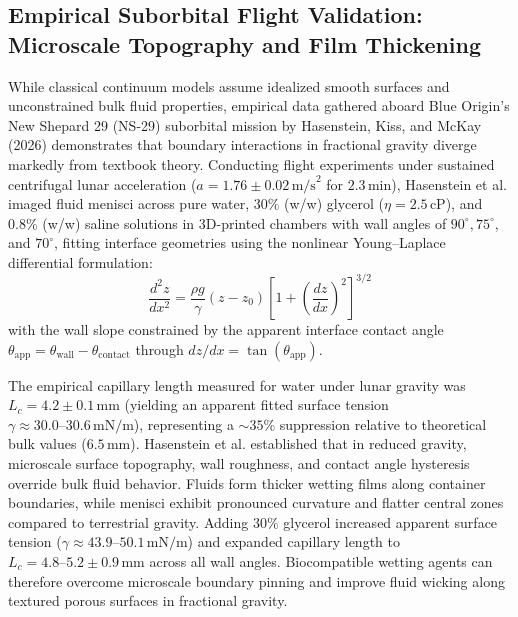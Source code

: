 \subsection{Empirical Suborbital Flight Validation: Microscale Topography and Film Thickening}
\label{subsec:empirical_flight_validation}

While classical continuum models assume idealized smooth surfaces and unconstrained bulk fluid properties, empirical data gathered aboard Blue Origin's New Shepard 29 (NS-29) suborbital mission by Hasenstein, Kiss, and McKay (2026) demonstrates that boundary interactions in fractional gravity diverge markedly from textbook theory\cite{hasenstein2026assessing}. Conducting flight experiments under sustained centrifugal lunar acceleration ($a = 1.76 \pm 0.02\,\mathrm{m/s}^2$ for $2.3\,\mathrm{min}$), Hasenstein et al. imaged fluid menisci across pure water, $30\%$ (w/w) glycerol ($\eta = 2.5\,\mathrm{cP}$), and $0.8\%$ (w/w) saline solutions in 3D-printed chambers with wall angles of $90^\circ, 75^\circ$, and $70^\circ$, fitting interface geometries using the nonlinear Young--Laplace differential formulation\cite{hasenstein2026assessing}:
\begin{equation}
    \frac{d^2z}{dx^2} = \frac{\rho g}{\gamma}(z - z_0) \left[ 1 + \left(\frac{dz}{dx}\right)^2 \right]^{3/2}
    \label{eq:young_laplace_diff}
\end{equation}
with the wall slope constrained by the apparent interface contact angle $\theta_\mathrm{app} = \theta_\mathrm{wall} - \theta_\mathrm{contact}$ through $dz/dx = \tan(\theta_\mathrm{app})$.

The empirical capillary length measured for water under lunar gravity was $L_c = 4.2 \pm 0.1\,\mathrm{mm}$ (yielding an apparent fitted surface tension $\gamma \approx 30.0\text{--}30.6\,\mathrm{mN/m}$), representing a $\sim 35\%$ suppression relative to theoretical bulk values ($6.5\,\mathrm{mm}$)\cite{hasenstein2026assessing}. Hasenstein et al. established that in reduced gravity, microscale surface topography, wall roughness, and contact angle hysteresis override bulk fluid behavior\cite{hasenstein2026assessing}. Fluids form thicker wetting films along container boundaries, while menisci exhibit pronounced curvature and flatter central zones compared to terrestrial gravity\cite{hasenstein2026assessing}. Adding $30\%$ glycerol increased apparent surface tension ($\gamma \approx 43.9\text{--}50.1\,\mathrm{mN/m}$) and expanded capillary length to $L_c = 4.8\text{--}5.2 \pm 0.9\,\mathrm{mm}$ across all wall angles\cite{hasenstein2026assessing}. Biocompatible wetting agents can therefore overcome microscale boundary pinning and improve fluid wicking along textured porous surfaces in fractional gravity\cite{hasenstein2026assessing}.

